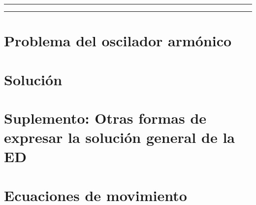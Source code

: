 \documentclass[12pt]{article}
\begin{document}


\tableofcontents			%

\begin{center}
	\rule[0mm]{150mm}{0.1mm}		%
	\end{center}
	
	
\begin{abstract}		%
  
\end{abstract}
	
\begin{center}
	\rule[0mm]{150mm}{0.1mm}
	\end{center}

\section{Problema del oscilador armónico}	
            
                            
\section{Solución}
    

\section{Suplemento: Otras formas de expresar la solución general de la ED}

	


\section{Ecuaciones de movimiento}
    
\end{document}

